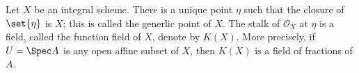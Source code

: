 Let $X$ be an integral scheme. There is a unique point $\eta$ such that the closure of $\set{\eta}$ is $X$;
this is called the generlic point of $X$. The stalk of $\mathcal{O}_X$ at $\eta$ is a field, called the function
field of $X$, denote by $K(X)$. More precisely, if $U = \Spec A$ is any open affine subset of $X$, then
$K(X)$ is a field of fractions of $A$.
